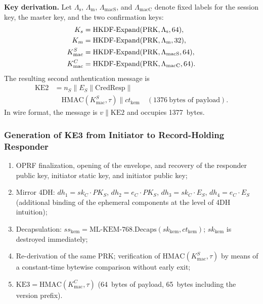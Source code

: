 \documentclass[preprint,12pt]{elsarticle}
\newcommand{\KLabel}[1]{\Lambda_{\mathrm{#1}}}
\theoremstyle{remark}
\begin{document}
\textbf{Key derivation.} Let
$\KLabel{s}$, $\KLabel{m}$, $\KLabel{macS}$, and $\KLabel{macC}$
denote fixed labels for the session key, the master key, and the two
confirmation keys:
\begin{align}
  K_s &= \mathrm{HKDF\text{-}Expand}(\mathrm{PRK}, \KLabel{s}, 64),
  \notag\\
  K_m &= \mathrm{HKDF\text{-}Expand}(\mathrm{PRK}, \KLabel{m}, 32),
  \notag\\
  K_{\mathrm{mac}}^S &= \mathrm{HKDF\text{-}Expand}(\mathrm{PRK},
    \KLabel{macS}, 64),
  \notag\\
  K_{\mathrm{mac}}^C &= \mathrm{HKDF\text{-}Expand}(\mathrm{PRK},
    \KLabel{macC}, 64).
  \label{eq:key-derivation}
\end{align}
The resulting second authentication message is
\begin{equation}
  \begin{aligned}
    \mathrm{KE2} &= n_S \| E_S \| \mathrm{CredResp} \| {}\\
    &\quad \mathrm{HMAC}(K_{\mathrm{mac}}^S, \tau) \| ct_{\mathrm{kem}}
      \quad(1376~\text{bytes of payload}).
  \end{aligned}
\end{equation}
In wire format, the message is $v \| \mathrm{KE2}$ and occupies
1377~bytes.

\subsubsection{Generation of KE3 from Initiator to Record-Holding Responder}

\begin{enumerate}
  \item OPRF finalization, opening of the envelope, and recovery of the
        responder public key, initiator static key, and initiator public
        key;
  \item Mirror 4DH:
        $dh_1 = sk_C \cdot PK_S$,
        $dh_2 = e_C \cdot PK_S$, $dh_3 = sk_C \cdot E_S$,
        $dh_4 = e_C \cdot E_S$ (additional binding of the ephemeral
        components at the level of 4DH intuition);
  \item Decapsulation:
        $ss_{\mathrm{kem}} =
        \mathrm{ML\text{-}KEM\text{-}768.Decaps}(sk_{\mathrm{kem}},
        ct_{\mathrm{kem}})$; $sk_{\mathrm{kem}}$ is destroyed
        immediately;
  \item Re-derivation of the same PRK; verification of
        $\mathrm{HMAC}(K_{\mathrm{mac}}^S, \tau)$ by means of a
        constant-time bytewise comparison without early exit;
  \item $\mathrm{KE3} = \mathrm{HMAC}(K_{\mathrm{mac}}^C, \tau)$
        (64~bytes of payload, 65~bytes including the version prefix).
\end{enumerate}
\end{document}
